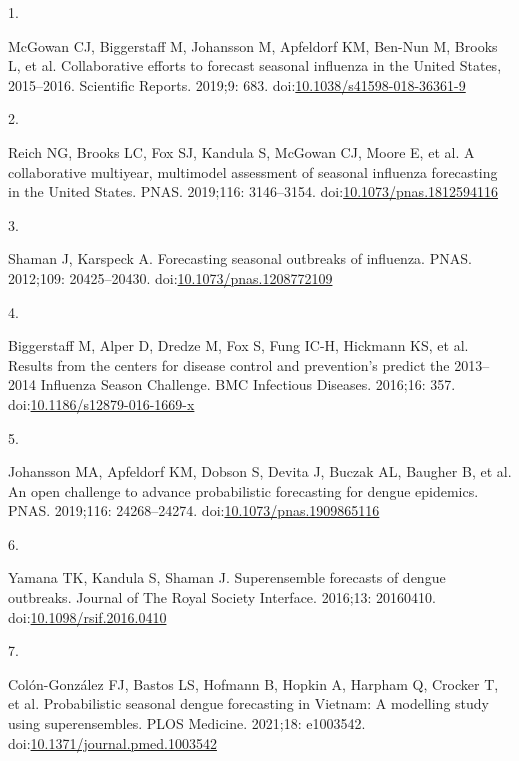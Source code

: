 \documentclass[10pt,letterpaper]{article}
\newlength{\cslhangindent}
\newlength{\csllabelwidth}
\newlength{\cslentryspacingunit} %
\newenvironment{CSLReferences}[2] %
 {%
  \setlength{\parindent}{0pt}
  \ifodd #1
  \let\oldpar\par
  \def\par{\hangindent=\cslhangindent\oldpar}
  \fi
  \setlength{\parskip}{#2\cslentryspacingunit}
 }%
 {}
\newcommand{\CSLLeftMargin}[1]{\parbox[t]{\csllabelwidth}{#1}}
\newcommand{\CSLRightInline}[1]{\parbox[t]{\linewidth - \csllabelwidth}{#1}\break}
\begin{document}
\hypertarget{refs}{}
\begin{CSLReferences}{0}{0}
\leavevmode{}%
\CSLLeftMargin{1. }%
\CSLRightInline{McGowan CJ, Biggerstaff M, Johansson M, Apfeldorf KM,
Ben-Nun M, Brooks L, et al. Collaborative efforts to forecast seasonal
influenza in the {United States}, 2015--2016. Scientific Reports.
2019;9: 683.
doi:\href{https://doi.org/10.1038/s41598-018-36361-9}{10.1038/s41598-018-36361-9}}

\leavevmode{}%
\CSLLeftMargin{2. }%
\CSLRightInline{Reich NG, Brooks LC, Fox SJ, Kandula S, McGowan CJ,
Moore E, et al. A collaborative multiyear, multimodel assessment of
seasonal influenza forecasting in the {United States}. PNAS. 2019;116:
3146--3154.
doi:\href{https://doi.org/10.1073/pnas.1812594116}{10.1073/pnas.1812594116}}

\leavevmode{}%
\CSLLeftMargin{3. }%
\CSLRightInline{Shaman J, Karspeck A. Forecasting seasonal outbreaks of
influenza. PNAS. 2012;109: 20425--20430.
doi:\href{https://doi.org/10.1073/pnas.1208772109}{10.1073/pnas.1208772109}}

\leavevmode{}%
\CSLLeftMargin{4. }%
\CSLRightInline{Biggerstaff M, Alper D, Dredze M, Fox S, Fung IC-H,
Hickmann KS, et al. Results from the centers for disease control and
prevention's predict the 2013--2014 {Influenza Season Challenge}. BMC
Infectious Diseases. 2016;16: 357.
doi:\href{https://doi.org/10.1186/s12879-016-1669-x}{10.1186/s12879-016-1669-x}}

\leavevmode{}%
\CSLLeftMargin{5. }%
\CSLRightInline{Johansson MA, Apfeldorf KM, Dobson S, Devita J, Buczak
AL, Baugher B, et al. An open challenge to advance probabilistic
forecasting for dengue epidemics. PNAS. 2019;116: 24268--24274.
doi:\href{https://doi.org/10.1073/pnas.1909865116}{10.1073/pnas.1909865116}}

\leavevmode{}%
\CSLLeftMargin{6. }%
\CSLRightInline{Yamana TK, Kandula S, Shaman J. Superensemble forecasts
of dengue outbreaks. Journal of The Royal Society Interface. 2016;13:
20160410.
doi:\href{https://doi.org/10.1098/rsif.2016.0410}{10.1098/rsif.2016.0410}}

\leavevmode{}%
\CSLLeftMargin{7. }%
\CSLRightInline{Colón-González FJ, Bastos LS, Hofmann B, Hopkin A,
Harpham Q, Crocker T, et al. Probabilistic seasonal dengue forecasting
in {Vietnam}: {A} modelling study using superensembles. PLOS Medicine.
2021;18: e1003542.
doi:\href{https://doi.org/10.1371/journal.pmed.1003542}{10.1371/journal.pmed.1003542}}


\end{CSLReferences}
\end{document}
